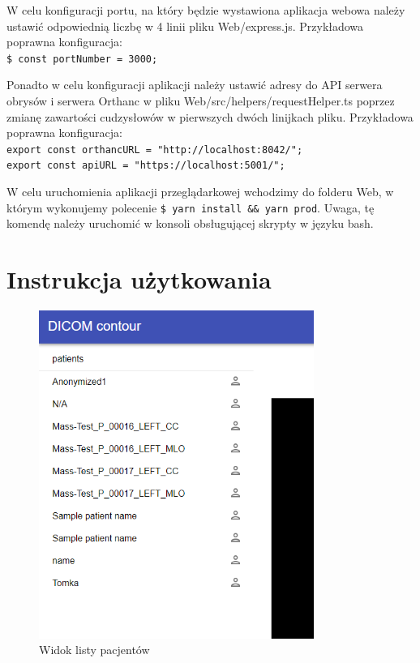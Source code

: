 \documentclass[a4paper,11pt,twoside,openright]{report}
\theoremstyle{definition}
\begin{document}
W celu konfiguracji portu, na który będzie wystawiona aplikacja webowa należy
ustawić odpowiednią liczbę w 4 linii pliku Web/express.js. Przykładowa poprawna
konfiguracja:\\
\texttt{\$ const portNumber = 3000;}

Ponadto w celu konfiguracji aplikacji należy ustawić adresy do API serwera obrysów
i serwera Orthanc w pliku Web/src/helpers/requestHelper.ts poprzez zmianę zawartości
cudzysłowów w pierwszych dwóch linijkach pliku. 	Przykładowa poprawna konfiguracja:\\
\texttt{export const orthancURL = "http://localhost:8042/";}\\
\texttt{export const apiURL = "https://localhost:5001/";}

W celu uruchomienia aplikacji przeglądarkowej wchodzimy do folderu Web, w którym
wykonujemy polecenie \texttt{\$ yarn install \&\& yarn prod}. Uwaga, tę komendę
należy uruchomić w konsoli obsługującej skrypty w języku bash.




\chapter*{Instrukcja użytkowania}

\begin{figure}[h!]
	\center
	\includegraphics[width=0.8\textwidth]{1}
	\caption{Widok listy pacjentów}
    	\label{fig:1}
\end{figure}
\end{document}
